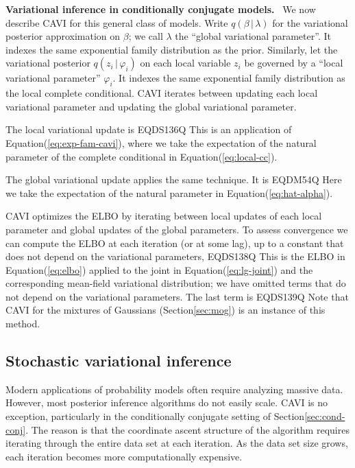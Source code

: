 \documentclass{article}
\DeclareRobustCommand{\parhead}[1]{\textbf{#1}~}
\begin{document}
\parhead{Variational inference in conditionally conjugate models.}  We
now describe \gls{CAVI} for this general class of models. Write
$q(\beta {\,\vert\,} \lambda)$ for the variational posterior approximation on
$\beta$; we call $\lambda$ the ``global variational parameter''.  It
indexes the same exponential family distribution as the prior.
Similarly, let the variational posterior $q(z_i {\,\vert\,} \varphi_i)$ on each
local variable $z_i$ be governed by a ``local variational parameter''
$\varphi_{i}$.  It indexes the same exponential family distribution as
the local complete conditional.  \gls{CAVI} iterates between updating
each local variational parameter and updating the global variational
parameter.

The local variational update is
EQDS136Q
This is an application of Equation\nobreakspace \textup {(\ref {eq:exp-fam-cavi})}, where we take the
expectation of the natural parameter of the complete conditional in
Equation\nobreakspace \textup {(\ref {eq:local-cc})}.

The global variational update applies the same technique.  It is
EQDM54Q
Here we take the expectation of the natural parameter in
Equation\nobreakspace \textup {(\ref {eq:hat-alpha})}.

\gls{CAVI} optimizes the \gls{ELBO} by iterating between local updates
of each local parameter and global updates of the global parameters.
To assess convergence we can compute the \gls{ELBO} at each iteration
(or at some lag), up to a constant that does not depend on the
variational parameters,
EQDS138Q
This is the \gls{ELBO} in Equation\nobreakspace \textup {(\ref {eq:elbo})} applied to the joint in
Equation\nobreakspace \textup {(\ref {eq:lg-joint})} and the corresponding mean-field variational
distribution; we have omitted terms that do not depend on the
variational parameters.  The last term is
EQDS139Q
Note that \gls{CAVI} for the mixtures of Gaussians (Section\nobreakspace \ref {sec:mog}) is
an instance of this method.
 \subsection{Stochastic variational inference}
\label{sec:svi}

Modern applications of probability models often require analyzing
massive data.  However, most posterior inference algorithms do not
easily scale. \gls{CAVI} is no exception, particularly in the
conditionally conjugate setting of Section\nobreakspace \ref {sec:cond-conj}.  The reason
is that the coordinate ascent structure of the algorithm requires
iterating through the entire data set at each iteration.  As the data
set size grows, each iteration becomes more computationally expensive.
\end{document}
